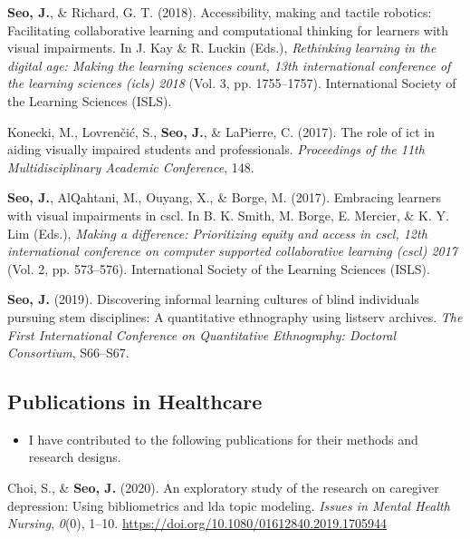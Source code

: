 \documentclass[11pt, a4paper]{awesome-cv}
\providecommand{\tightlist}{%
	\setlength{\itemsep}{0pt}\setlength{\parskip}{0pt}}
\begin{document}
\leavevmode\hypertarget{ref-seo2018accessibility}{}%
\textbf{Seo, J.}, \& Richard, G. T. (2018). Accessibility, making and
tactile robotics: Facilitating collaborative learning and computational
thinking for learners with visual impairments. In J. Kay \& R. Luckin
(Eds.), \emph{Rethinking learning in the digital age: Making the
learning sciences count, 13th international conference of the learning
sciences (icls) 2018} (Vol. 3, pp. 1755--1757). International Society of
the Learning Sciences (ISLS).

\leavevmode\hypertarget{ref-konecki2017role}{}%
Konecki, M., Lovrenčić, S., \textbf{Seo, J.}, \& LaPierre, C. (2017).
The role of ict in aiding visually impaired students and professionals.
\emph{Proceedings of the 11th Multidisciplinary Academic Conference},
148.

\leavevmode\hypertarget{ref-seo2017embracing}{}%
\textbf{Seo, J.}, AlQahtani, M., Ouyang, X., \& Borge, M. (2017).
Embracing learners with visual impairments in cscl. In B. K. Smith, M.
Borge, E. Mercier, \& K. Y. Lim (Eds.), \emph{Making a difference:
Prioritizing equity and access in cscl, 12th international conference on
computer supported collaborative learning (cscl) 2017} (Vol. 2, pp.
573--576). International Society of the Learning Sciences (ISLS).

\leavevmode\hypertarget{ref-seo2019discovering}{}%
\textbf{Seo, J.} (2019). Discovering informal learning cultures of blind
individuals pursuing stem disciplines: A quantitative ethnography using
listserv archives. \emph{The First International Conference on
Quantitative Ethnography: Doctoral Consortium}, S66--S67.

\endgroup

\hypertarget{publications-in-healthcare}{%
\subsection{Publications in
Healthcare}\label{publications-in-healthcare}}

\begin{itemize}
\tightlist
\item
  I have contributed to the following publications for their methods and
  research designs.
\end{itemize}

\begingroup
\setlength{\parindent}{-0.5in}
\setlength{\leftskip}{0.5in}

\hypertarget{refs_healthcare}{}
\leavevmode\hypertarget{ref-doi:10.1080ux2f01612840.2019.1705944}{}%
Choi, S., \& \textbf{Seo, J.} (2020). An exploratory study of the
research on caregiver depression: Using bibliometrics and lda topic
modeling. \emph{Issues in Mental Health Nursing}, \emph{0}(0), 1--10.
\url{https://doi.org/10.1080/01612840.2019.1705944}
\end{document}
